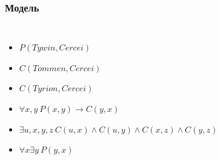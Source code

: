 \documentclass[24pt,pdf,hyperref={unicode}]{beamer}
\begin{document}
\begin{frame}\frametitle{Модель}
\begin{columns}





\begin{itemize}
\item<+-> $P(Tywin,Cercei)$

\item<+-> $C(Tommen,Cercei)$

\item<+-> $C(Tyrion,Cercei)$

\item<+-> $\forall x,y\ P(x,y)\rightarrow C(y,x)$

\item<+-> $\exists u,x,y,z\ C(u,x)\wedge C(u,y)\wedge C(x,z)\wedge C(y,z)$

\item<+-> $\forall x \exists y\ P(y,x)$
\end{itemize}
\end{columns}
\end{frame}
\end{document}

